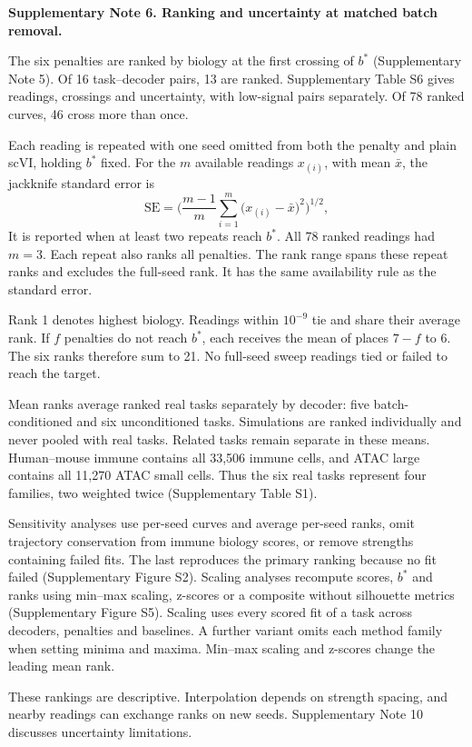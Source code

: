 \medskip\noindent\textbf{Supplementary Note 6. Ranking and uncertainty at matched batch removal.}\par\smallskip
\begingroup\small\setlength{\parskip}{3pt}
The six penalties are ranked by biology at the first crossing of $b^*$ (Supplementary Note 5). Of 16 task--decoder pairs, 13 are ranked. Supplementary Table S6 gives readings, crossings and uncertainty, with low-signal pairs separately. Of 78 ranked curves, 46 cross more than once.

Each reading is repeated with one seed omitted from both the penalty and plain scVI, holding $b^*$ fixed. For the $m$ available readings $x_{(i)}$, with mean $\bar x$, the jackknife standard error is
\begin{equation}
\mathrm{SE}=\Big(\frac{m-1}{m}\sum_{i=1}^{m}\big(x_{(i)}-\bar x\big)^2\Big)^{1/2},
\label{eq:s6-loso}
\end{equation}
It is reported when at least two repeats reach $b^*$. All 78 ranked readings had $m=3$. Each repeat also ranks all penalties. The rank range spans these repeat ranks and excludes the full-seed rank. It has the same availability rule as the standard error.

Rank 1 denotes highest biology. Readings within $10^{-9}$ tie and share their average rank. If $f$ penalties do not reach $b^*$, each receives the mean of places $7-f$ to 6. The six ranks therefore sum to 21. No full-seed sweep readings tied or failed to reach the target.

Mean ranks average ranked real tasks separately by decoder: five batch-conditioned and six unconditioned tasks. Simulations are ranked individually and never pooled with real tasks. Related tasks remain separate in these means. Human--mouse immune contains all 33,506 immune cells, and ATAC large contains all 11,270 ATAC small cells. Thus the six real tasks represent four families, two weighted twice (Supplementary Table S1).

Sensitivity analyses use per-seed curves and average per-seed ranks, omit trajectory conservation from immune biology scores, or remove strengths containing failed fits. The last reproduces the primary ranking because no fit failed (Supplementary Figure S2). Scaling analyses recompute scores, $b^*$ and ranks using min--max scaling, z-scores or a composite without silhouette metrics (Supplementary Figure S5). Scaling uses every scored fit of a task across decoders, penalties and baselines. A further variant omits each method family when setting minima and maxima. Min--max scaling and z-scores change the leading mean rank.

These rankings are descriptive. Interpolation depends on strength spacing, and nearby readings can exchange ranks on new seeds. Supplementary Note 10 discusses uncertainty limitations.
\par\endgroup
